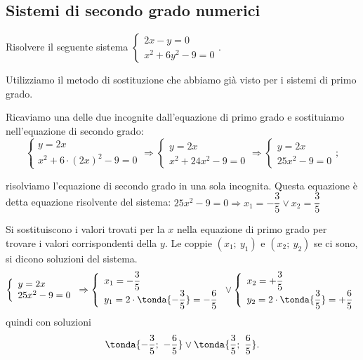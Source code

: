 \subsection{Sistemi di secondo grado numerici}
\begin{esempio}
Risolvere il seguente sistema 
\(\left\{\begin{array}{l}{2x-y=0}\\{x^2+6y^2-9=0}\end{array}\right..\)

Utilizziamo il metodo di sostituzione che abbiamo già visto per i sistemi di 
primo grado.
\begin{itemize*}
\item Ricaviamo una delle due incognite dall'equazione di primo grado e 
sostituiamo nell'equazione di secondo grado:
\[\left\{\begin{array}{l}y=2x \\
x^2+6\cdot (2x)^2-9=0\end{array}\right. 
\Rightarrow\left\{\begin{array}{l}y=2x \\
x^2+24x^2-9=0\end{array}\right. 
\Rightarrow \left\{\begin{array}{l}y=2x \\
25x^2-9=0\end{array}\right.;\]
\item risolviamo l'equazione di secondo grado in una sola incognita. Questa 
equazione è detta equazione risolvente del sistema:
 \(25x^2-9=0\Rightarrow x_1=-\dfrac 3 5\vee x_2=\dfrac 3 5\)
\item Si sostituiscono i valori trovati per la \( x \) nella equazione di primo 
grado per trovare i valori corrispondenti della \( y \). Le coppie 
\((x_1;~y_1)\) 
e 
\((x_2;~y_2)\) se ci sono, si dicono soluzioni del sistema.
\[\left\{\begin{array}{l}{y=2x}\\
{25x^2-9=0}\end{array}\right. 
\Rightarrow \left\{\begin{array}{l}x_1=-\dfrac 3 5 \\
y_1=2\cdot \tonda{-\dfrac 3 5}=-\dfrac 6 5\end{array}\right.\vee 
\left\{\begin{array}{l}x_2=+\dfrac 3 5 \\
y_2=2\cdot \tonda{\dfrac 3 5}=+\dfrac 6 5 \end{array}\right.\] 
quindi con soluzioni 
\[\tonda{-\dfrac 3 5;~-\dfrac 6 5}\vee \tonda{\dfrac 3 5;~\dfrac 6 
5}.\]
\end{itemize*}


\end{esempio}
